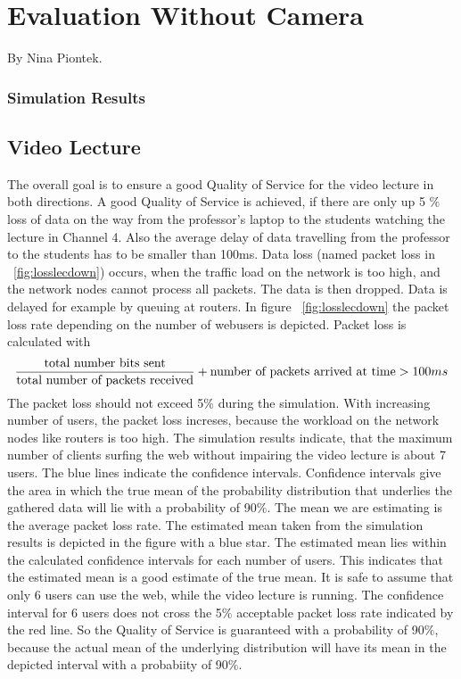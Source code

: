 \documentclass[a4paper,10pt]{book}\usepackage{graphicx}
\begin{document}
\chapter{Evaluation Without Camera}
By Nina Piontek.\\

\subsection{Simulation Results}
\section{Video Lecture}
The overall goal is to ensure a good Quality of Service for the video lecture in both directions.
A good Quality of Service is achieved, if there are only up 5 $\%$ loss of data
on the way from the professor's laptop to the students watching the lecture in Channel 4. Also the average delay of data travelling from the professor to the students has to be smaller than 100ms.
Data loss (named packet loss in ~\ref{fig:losslecdown}) occurs, when the traffic load on the network is too high, and the network nodes cannot process all packets.
The data is then dropped. Data is delayed for example by queuing at routers.
In figure  ~\ref{fig:losslecdown} the packet loss rate depending on the number of
webusers is depicted. Packet loss is calculated with
\begin{equation}
 \frac{\textnormal{total number bits sent}}{\textnormal{total number of packets received}} + \textnormal{number of packets arrived at time} > 100ms
\end{equation}
The packet loss should not exceed 5$\%$ during the simulation.
With increasing number of users, the packet loss increses, because the 
workload on the network nodes like routers is too high.
The simulation results indicate, that the maximum number of clients surfing the 
web without impairing the video lecture is about 7 users.
The blue lines indicate the confidence intervals. Confidence intervals give the area in which 
the true mean of the probability distribution that underlies the gathered data will lie with a probability of 90$\%$.
The mean we are estimating is the average packet loss rate. The estimated mean taken from the simulation results is depicted in the figure with a blue star.
The estimated mean lies within the calculated confidence intervals for each number of users. This indicates that the estimated mean is a good estimate of the true mean.
It is safe to assume that only 6 users can use the web, while the video lecture is running.
The confidence interval for 6 users does not cross the 5$\%$ acceptable packet loss 
rate indicated by the red line. So the Quality of Service is guaranteed with a probability of 90$\%$, because the actual mean of the
underlying distribution will have its mean in the depicted interval with a probabiity of 90$\%$.
\end{document}
